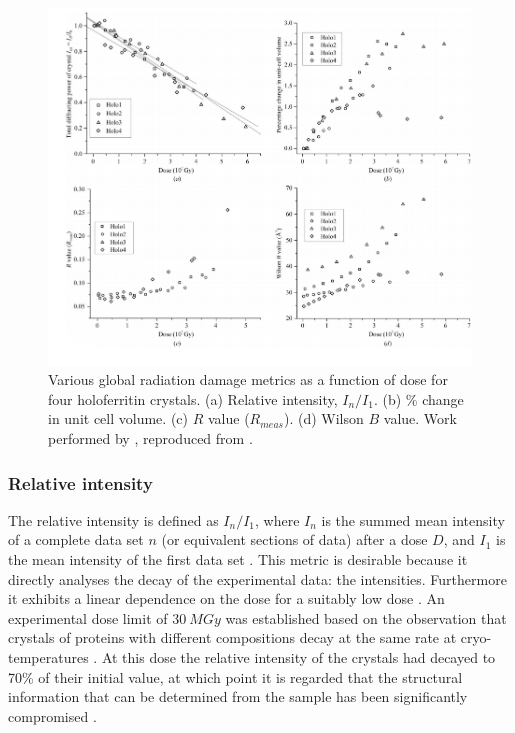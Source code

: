         \begin{figure}
            \centering
            \includegraphics[width=1.0\textwidth]{figures/introduction/raddammetrics.png}
            \caption{Various global radiation damage metrics as a function of dose for four holoferritin crystals.
            (a) Relative intensity, $I_n/I_1$.
            (b) \% change in unit cell volume.
            (c) $R$ value ($R_{meas}$).
            (d) Wilson $B$ value.
            Work performed by \cite{owen2006}, reproduced from \cite{garman2010}.}
            \label{fig:Radiation damage metrics}
        \end{figure}

        \subsubsection{Relative intensity}
        \label{subs:Relative intensity}
            The relative intensity is defined as $I_n/I_1$, where $I_n$ is the summed mean intensity of a complete data set $n$ (or equivalent sections of data) after a dose $D$, and $I_1$ is the mean intensity of the first data set \cite{garman2010}.
            This metric is desirable because it directly analyses the decay of the experimental data: the intensities. Furthermore it exhibits a linear dependence on the dose for a suitably low dose \cite{owen2006,zeldin2013dwd}.
            An experimental dose limit of $30\ MGy$ was established based on the observation that crystals of proteins with different compositions decay at the same rate at cryo-temperatures \cite{owen2006}.
            At this dose the relative intensity of the crystals had decayed to 70\% of their initial value, at which point it is regarded that the structural information that can be determined from the sample has been significantly compromised \cite{owen2006,blundell1976protein}.

